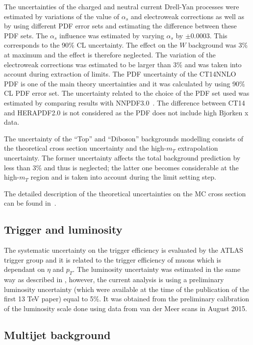 The uncertainties of the charged and neutral current Drell-Yan processes were estimated by variations of the value of $\alpha_s$ and electroweak corrections as well as by using different PDF error sets and estimating the difference between these PDF sets.
The $\alpha_s$ influence was estimated by varying $\alpha_s$ by $\pm 0.0003$. This corresponds to the 90\% CL uncertainty. The effect on the $W$ background 
was $3\%$ at maximum and the effect is therefore neglected. 
The variation of the electroweak corrections was estimated to be larger than $3\%$ and was
taken into account during extraction of limits.
The PDF uncertainty of the CT14NNLO PDF is one of the main theory uncertainties
and it was calculated by using 90$\%$ CL PDF error set.
The uncertainty related to the choice of the PDF set used was estimated by comparing
results with NNPDF3.0~\cite{Ball:2014uwa}.
The difference between CT14 and HERAPDF2.0 is not considered as the PDF does not include high Bjorken x data. 

The uncertainty of the ``Top'' and ``Diboson'' backgrounds modelling consists of the theoretical cross section uncertainty and the high-$m_T$ extrapolation uncertainty. The former uncertainty affects the total background
prediction by less than 3$\%$ and thus is neglected; the latter one becomes considerable at the high-$m_T$ region and is taken into account during the limit setting step.

The detailed description of the theoretical uncertainties on the MC cross section can be found in~\cite{Aaboud:2016zkn}.

\subsection{Trigger and luminosity}
The systematic uncertainty on the trigger efficiency is evaluated by the ATLAS trigger group and it is related to the trigger
efficiency of muons which is dependant on $\eta$ and $p_T$.
The luminosity uncertainty was estimated in the same way as described in , however, the current analysis is using a preliminary luminosity
uncertainty (which were available at the time of the publication of the first 13 TeV paper) equal to 5$\%$. It was obtained from the preliminary calibration of the luminosity scale done using data from van der Meer scans in August 2015.

\subsection{Multijet background}
\label{subsec:multijet_systematcs}

